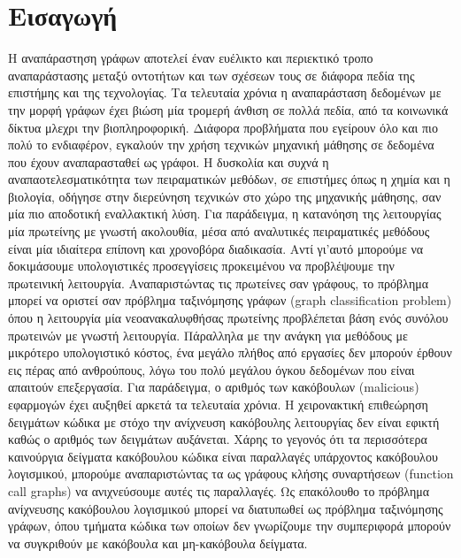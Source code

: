 \mainmatter
\chapter{Εισαγωγή}
\label{chap1}



Η αναπάραστηση γράφων αποτελεί έναν ευέλικτο και περιεκτικό τροπο αναπαράστασης μεταξύ οντοτήτων και των σχέσεων τους σε διάφορα πεδία της επιστήμης και της τεχνολογίας.
Τα τελευταία χρόνια η αναπαράσταση δεδομένων με την μορφή γράφων έχει βιώση μία τρομερή άνθιση σε πολλά πεδία, από τα κοινωνικά δίκτυα μλεχρι την βιοπληροφορική.
Διάφορα προβλήματα που εγείρουν όλο και πιο πολύ το ενδιαφέρον, εγκαλούν την χρήση τεχνικών μηχανική μάθησης σε δεδομένα που έχουν αναπαρασταθεί ως γράφοι.
Η δυσκολία και συχνά η αναπαοτελεσματικότητα των πειραματικών μεθόδων, σε επιστήμες όπως η χημία και η βιολογία, οδήγησε στην διερεύνηση τεχνικών στο χώρο της μηχανικής μάθησης, σαν μία πιο αποδοτική εναλλακτική λύση. Για παράδειγμα, η κατανόηση της λειτουργίας μία πρωτείνης με γνωστή ακολουθία, μέσα από αναλυτικές πειραματικές μεθόδους είναι μία ιδιαίτερα επίπονη και χρονοβόρα διαδικασία.
Αντί γι'αυτό μπορούμε να δοκιμάσουμε υπολογιστικές προσεγγίσεις προκειμένου να προβλέψουμε την πρωτεινική λειτουργία.
Αναπαριστώντας τις πρωτείνες σαν γράφους, το πρόβλημα μπορεί να οριστεί σαν πρόβλημα ταξινόμησης γράφων (graph classification problem) όπου η λειτουργία μία νεοανακαλυφθήσας πρωτείνης προβλέπεται βάση ενός συνόλου πρωτεινών με γνωστή λειτουργία. 
Πάραλληλα με την ανάγκη για μεθόδους με μικρότερο υπολογιστικό κόστος, ένα μεγάλο πλήθος από εργασίες δεν μπορούν έρθουν εις πέρας από ανθρούπους, λόγω του πολύ μεγάλου όγκου δεδομένων που είναι απαιτούν επεξεργασία.
Για παράδειγμα, ο αριθμός των κακόβουλων (malicious) εφαρμογών έχει αυξηθεί αρκετά τα τελευταία χρόνια.
Η χειρονακτική επιθεώρηση δειγμάτων κώδικα με στόχο την ανίχνευση κακόβουλης λειτουργίας δεν είναι εφικτή καθώς ο αριθμός των δειγμάτων αυξάνεται. 
Χάρης το γεγονός ότι τα περισσότερα καινούργια δείγματα κακόβουλου κώδικα είναι παραλλαγές υπάρχοντος κακόβουλου λογισμικού, μπορούμε αναπαριστώντας τα ως γράφους κλήσης συναρτήσεων (function call graphs) να ανιχνεύσουμε αυτές τις παραλλαγές.
Ως επακόλουθο το πρόβλημα ανίχνευσης κακόβουλου λογισμικού μπορεί να διατυπωθεί ως πρόβλημα ταξινόμησης γράφων, όπου τμήματα κώδικα των οποίων δεν γνωρίζουμε την συμπεριφορά μπορούν να συγκριθούν με κακόβουλα και μη-κακόβουλα δείγματα. 
